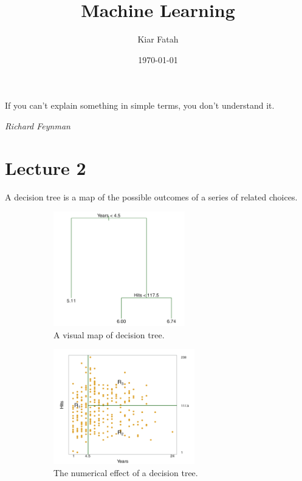 \documentclass[12pt]{article}
\title{Machine Learning}
\author{Kiar Fatah}
\date{\today}
\numberwithin{equation}{section}
\begin{document}
\maketitle

\newpage

\tableofcontents 

\newpage
\epigraph{If you can’t explain something in simple terms, you don’t understand it.}{\textit{Richard Feynman }}
\newpage
\section{Lecture 2}
A decision tree is a map of the possible outcomes of a series of related choices.
\begin{figure}[!ht]
 
        \begin{subfigure}{0.5\textwidth}
        \includegraphics[width=1\linewidth, height=5cm]{decision1.png}
        \caption{A visual map of decision tree.}
        \label{fig:rw}
        \end{subfigure}
        \begin{subfigure}{0.5\textwidth}
        \includegraphics[width=1\linewidth, height=5cm]{decision2.png} 
        \caption{The numerical effect of a decision tree.}
        \label{1}
        
        \end{subfigure}
         
        \caption{}
        \label{fig:image2}
\end{figure}
\end{document}
